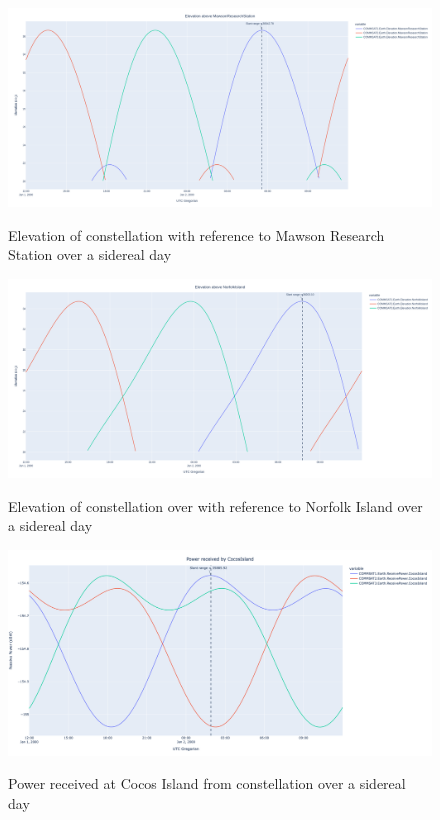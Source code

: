 \documentclass[12pt]{article}
\begin{document}
\begin{figure}[H]
    \centering
    \includegraphics[width=\linewidth]{figures/MawsonElevation.png}\\
    \caption{Elevation of constellation  with reference to Mawson Research Station over a sidereal day}
    \label{fig:mawson_elevation}
\end{figure}
\begin{figure}[H]
    \centering
    \includegraphics[width=\linewidth]{figures/NorfolkElevation.png}\\
    \caption{Elevation of constellation over with reference to Norfolk Island over a sidereal day}
    \label{fig:norfolk_elevation}
\end{figure}
\begin{figure}[H]
    \centering
    \includegraphics[width=\linewidth]{figures/CocosReceivePower.png}\\
    \caption{Power received at Cocos Island from constellation over a sidereal day}
    \label{fig:cocos_power}
\end{figure}
\end{document}
